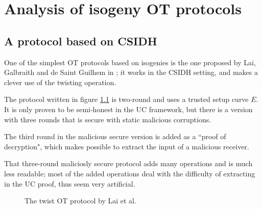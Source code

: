 \chapter{Analysis of isogeny OT protocols}

\section{A protocol based on CSIDH}
One of the simplest OT protocols based on isogenies is the one proposed by Lai, Galbraith and de Saint Guilhem in \cite{Lai_twists}; it works in the CSIDH setting, and makes a clever use of the twisting operation.

The protocol written in figure \ref{prot_twist} is two-round and uses a trusted setup curve $E$. It is only proven to be semi-honest in the UC framework, but there is a version with three rounds that is secure with static malicious corruptions.

The third round in the malicious secure version is added as a ``proof of decryption", which makes possible to extract the input of a malicious receiver.

That three-round maliciosly secure protocol adds many operations and is much less readable; most of the added operations deal with the difficulty of extracting in the UC proof, thus seem very artificial.

\begin{figure}
    \caption{The twist OT protocol by Lai et al.}
    \label{prot_twist}
\end{figure}


